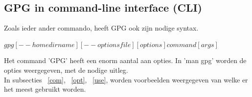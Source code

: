 \documentclass[12pt]{article}
\begin{document}
			\subsection{GPG in command-line interface (CLI)}\label{CLI}
				Zoals ieder ander commando, heeft GPG ook zijn nodige syntax.\\
				\begin{center}
					$gpg  [--homedir name]  [--options file]  [options]  command  [args]$\\
				\end{center}
				Het command 'GPG' heeft een enorm aantal aan opties. In 'man gpg' worden de opties weergegeven, met de nodige uitleg.\\
				In subsecties ~\ref{com}, ~\ref{opt}, ~\ref{use}, worden voorbeelden weergegeven van welke er het meest gebruikt worden.\\
				
				\newpage
\end{document}
